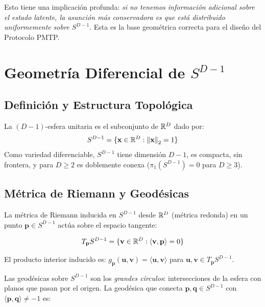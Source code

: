 Esto tiene una implicación profunda: \textit{si no tenemos información adicional
sobre el estado latente, la asunción más conservadora es que está distribuido
uniformemente sobre $S^{D-1}$}. Esta es la base geométrica correcta para el diseño
del Protocolo PMTP.

\section{Geometría Diferencial de $S^{D-1}$}

\subsection{Definición y Estructura Topológica}

\begin{definition}
La $(D-1)$-esfera unitaria es el subconjunto de $\mathbb{R}^D$ dado por:
\begin{equation}
S^{D-1} = \{\mathbf{x} \in \mathbb{R}^D : \norm{\mathbf{x}}_2 = 1\}
\label{eq:sphere_def}
\end{equation}
Como variedad diferenciable, $S^{D-1}$ tiene dimensión $D-1$, es compacta,
sin frontera, y para $D \ge 2$ es doblemente conexa ($\pi_1(S^{D-1}) = 0$
para $D \ge 3$).
\end{definition}

\subsection{Métrica de Riemann y Geodésicas}

La métrica de Riemann inducida en $S^{D-1}$ desde $\mathbb{R}^D$ (métrica redonda) en
un punto $\mathbf{p} \in S^{D-1}$ actúa sobre el espacio tangente:

\begin{equation}
T_{\mathbf{p}} S^{D-1} = \{\mathbf{v} \in \mathbb{R}^D : \langle \mathbf{v}, \mathbf{p} \rangle = 0\}
\label{eq:tangent_space}
\end{equation}

El producto interior inducido es: $g_{\mathbf{p}}(\mathbf{u}, \mathbf{v}) = \langle \mathbf{u}, \mathbf{v} \rangle$
para $\mathbf{u}, \mathbf{v} \in T_{\mathbf{p}} S^{D-1}$.

Las geodésicas sobre $S^{D-1}$ son los \textit{grandes círculos}: intersecciones
de la esfera con planos que pasan por el origen. La geodésica que conecta
$\mathbf{p}, \mathbf{q} \in S^{D-1}$ con $\langle \mathbf{p}, \mathbf{q} \rangle \ne -1$ es:


